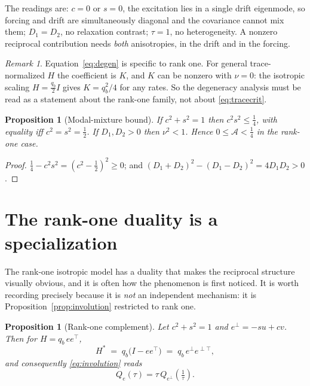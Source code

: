 \documentclass[11pt]{article}
\theoremstyle{plain}
\newtheorem{proposition}[theorem]{Proposition}
\theoremstyle{definition}
\theoremstyle{remark}
\newtheorem{remark}[theorem]{Remark}
\newcommand{\Aco}{\mathcal{A}}
\newcommand{\eperp}{e^{\perp}}
\newcommand{\eperpT}{e^{\perp\!\top}}
\newcommand{\T}{^{\!\top}}
\begin{document}
The readings are: $c=0$ or $s=0$, the excitation lies in a single drift eigenmode, so forcing
and drift are simultaneously diagonal and the covariance cannot mix them; $D_1=D_2$, no
relaxation contrast; $\tau=1$, no heterogeneity. A nonzero reciprocal contribution needs
\emph{both} anisotropies, in the drift and in the forcing.

\begin{remark}
Equation~\eqref{eq:degen} is specific to rank one. For general trace-normalized $H$ the
coefficient is $K$, and $K$ can be nonzero with $\nu=0$: the isotropic scaling
$H=\tfrac{q_b}{2}I$ gives $K=q_b^2/4$ for any rates. So the degeneracy analysis must be read as
a statement about the rank-one family, not about \eqref{eq:tracecrit}.
\end{remark}

\begin{proposition}[Modal-mixture bound]\label{prop:mixing}
If $c^2+s^2=1$ then $c^2s^2\le\tfrac14$, with equality iff $c^2=s^2=\tfrac12$. If $D_1,D_2>0$
then $\nu^2<1$. Hence $0\le\Aco<\tfrac14$ in the rank-one case.
\end{proposition}

\begin{proof}
$\tfrac14-c^2s^2=(c^2-\tfrac12)^2\ge0$; and $(D_1+D_2)^2-(D_1-D_2)^2=4D_1D_2>0$.
\end{proof}

\section{The rank-one duality is a specialization}\label{sec:selfdual}

The rank-one isotropic model has a duality that makes the reciprocal structure visually obvious,
and it is often how the phenomenon is first noticed. It is worth recording precisely because it
is \emph{not} an independent mechanism: it is Proposition~\ref{prop:involution} restricted to
rank one.

\begin{proposition}[Rank-one complement]\label{prop:selfdual}
Let $c^2+s^2=1$ and $\eperp=-su+cv$. Then for $H=q_b\,ee\T$,
\begin{equation}
  H^{*} \;=\; q_b\bigl(I-ee\T\bigr) \;=\; q_b\,\eperp\eperpT, \label{eq:rankonecomp}
\end{equation}
and consequently \eqref{eq:involution} reads
\begin{equation}
  Q_e(\tau)=\tau\,Q_{\eperp}\!\left(\tfrac1\tau\right). \label{eq:selfdual}
\end{equation}
\end{proposition}
\end{document}
